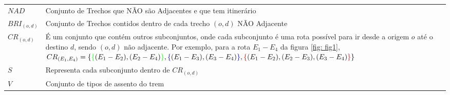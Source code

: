 \begin{table}[H]
\begin{tabular}{p{2cm} p{9.5cm} p{3.2cm}}
		$NAD$              & \multicolumn{2}{p{12.7cm}}{Conjunto de Trechos que NÃO são Adjacentes e que tem itinerário}                                                                                                                                                                                                                                                                                                                                                                                  \\
		$BRI_{(o,d)}$      & \multicolumn{2}{p{12.7cm}}{Conjunto de Trechos contidos dentro de cada trecho $(o,d)$ NÃO Adjacente }                                                                                                                                                                                                                                                                                                                                                                        \\
		$CR_{(o,d)}$       & \multicolumn{2}{p{12.7cm}}{É um conjunto que contém outros subconjuntos, onde cada subconjunto é uma rota possível para ir desde a origem $o$ até o destino $d$, sendo $(o,d)$ não adjacente. Por exemplo, para a rota $E_1 - E_4$ da figura \ref{fig: fig1}, $CR_{(E_1,E_4)}=\{ \textcolor{green}{\{} (E_1-E_2),(E_2-E_4)\textcolor{green}{\}}, \textcolor{blue}{\{} (E_1-E_3),(E_3-E_4)\textcolor{blue}{\}}, \textcolor{red}{\{}(E_1-E_2),(E_2-E_3),(E_3-E_4) \textcolor{red}{\}} \} $}                                                                                                                                                                                                                                 \\
		$S$                & Representa cada subconjunto dentro de $CR_{(o,d)}$                                                                                                                                                                                                                                                                                                                                                                          &                                              \\
		$V$                & Conjunto de tipos de assento do trem                                                                                                                                                                                                                                                                                                                                                                                                 &                                              \\

\end{tabular}
\end{table}
